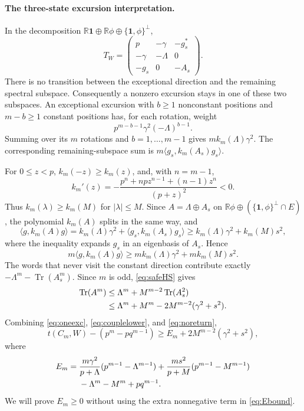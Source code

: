 \documentclass[11pt]{article}
\numberwithin{equation}{section}
\theoremstyle{remark}
\newcommand{\Tr}{\operatorname{Tr}}
\newcommand{\one}{\mathbf 1}
\newcommand{\R}{\mathbb R}
\newcommand{\ip}[2]{\langle #1,#2\rangle}
\begin{document}
\paragraph{The three-state excursion interpretation.}
In the decomposition $\R\one\oplus\R\phi\oplus\{\one,\phi\}^\perp$,
\begin{equation}\label{eq:threeblocks}
 T_W=\begin{pmatrix}
 p&-\gamma&-g_s^*\\
 -\gamma&-\Lambda&0\\
 -g_s&0&-A_s
 \end{pmatrix}.
\end{equation}
There is no transition between the exceptional direction and the remaining spectral subspace. Consequently a nonzero excursion stays in one of these two subspaces. An exceptional excursion with $b\ge1$ nonconstant positions and $m-b\ge1$ constant positions has, for each rotation, weight
\[
 p^{m-b-1}\gamma^2(-\Lambda)^{b-1}.
\]
Summing over its $m$ rotations and $b=1,\ldots,m-1$ gives $m k_m(\Lambda)\gamma^2$. The corresponding remaining-subspace sum is $m\ip{g_s}{k_m(A_s)g_s}$.

For $0\le z<p$, $k_m(-z)\ge k_m(z)$, and, with $n=m-1$,
\[
 k_m'(z)=-\frac{p^n+npz^{n-1}+(n-1)z^n}{(p+z)^2}<0.
\]
Thus $k_m(\lambda)\ge k_m(M)$ for $|\lambda|\le M$. Since $A=\Lambda\oplus A_s$ on $\R\phi\oplus(\{\one,\phi\}^\perp\cap E)$, the polynomial $k_m(A)$ splits in the same way, and
\[
 \ip{g}{k_m(A)g}=k_m(\Lambda)\gamma^2+\ip{g_s}{k_m(A_s)g_s}
 \ge k_m(\Lambda)\gamma^2+k_m(M)s^2,
\]
where the inequality expands $g_s$ in an eigenbasis of $A_s$. Hence
\begin{equation}\label{eq:couplelower}
 m\ip{g}{k_m(A)g}\ge m k_m(\Lambda)\gamma^2+m k_m(M)s^2.
\end{equation}
The words that never visit the constant direction contribute exactly $-\Lambda^m-\Tr(A_s^m)$. Since $m$ is odd, \eqref{eq:safeHS} gives
\begin{align}\label{eq:noreturn}
 \Tr(A^m)
 &\le\Lambda^m+M^{m-2}\Tr(A_s^2)\notag\\
 &\le\Lambda^m+M^m-2M^{m-2}(\gamma^2+s^2).
\end{align}
Combining \eqref{eq:oneexc}, \eqref{eq:couplelower}, and \eqref{eq:noreturn},
\begin{equation}\label{eq:Ebound}
 t(C_m,W)-(p^m-pq^{m-1})\ge E_m+2M^{m-2}(\gamma^2+s^2),
\end{equation}
where
\begin{align}\label{eq:E}
 E_m={}&\frac{m\gamma^2}{p+\Lambda}(p^{m-1}-\Lambda^{m-1})
 +\frac{ms^2}{p+M}(p^{m-1}-M^{m-1})\notag\\
 &-\Lambda^m-M^m+pq^{m-1}.
\end{align}
We will prove $E_m\ge0$ without using the extra nonnegative term in \eqref{eq:Ebound}.
\end{document}
